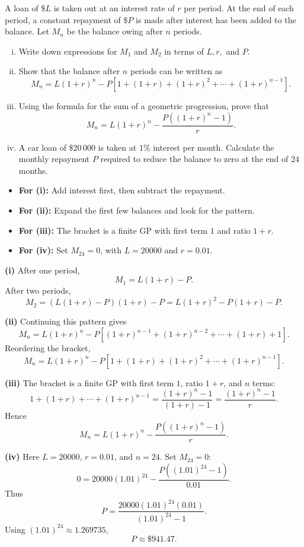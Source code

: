 \newpage
\begin{problem}
A loan of $\$L$ is taken out at an interest rate of $r$ per period. At the end of each period, a constant repayment of $\$P$ is made after interest has been added to the balance. Let $M_n$ be the balance owing after $n$ periods.

\begin{enumerate}[(i)]
\item Write down expressions for $M_1$ and $M_2$ in terms of $L,r,$ and $P$.
\item Show that the balance after $n$ periods can be written as
\[
M_n=L(1+r)^n-P\left[1+(1+r)+(1+r)^2+\cdots+(1+r)^{n-1}\right].
\]
\item Using the formula for the sum of a geometric progression, prove that
\[
M_n=L(1+r)^n-\frac{P((1+r)^n-1)}{r}.
\]
\item A car loan of $\$20\,000$ is taken at $1\%$ interest per month. Calculate the monthly repayment $P$ required to reduce the balance to zero at the end of $24$ months.
\end{enumerate}
\end{problem}
\begin{hint}
\begin{itemize}
\item \textbf{For (i):} Add interest first, then subtract the repayment.
\item \textbf{For (ii):} Expand the first few balances and look for the pattern.
\item \textbf{For (iii):} The bracket is a finite GP with first term $1$ and ratio $1+r$.
\item \textbf{For (iv):} Set $M_{24}=0$, with $L=20000$ and $r=0.01$.
\end{itemize}
\end{hint}
\begin{solution}
\textbf{(i)} After one period,
\[
M_1=L(1+r)-P.
\]
After two periods,
\[
M_2=(L(1+r)-P)(1+r)-P=L(1+r)^2-P(1+r)-P.
\]

\textbf{(ii)} Continuing this pattern gives
\[
M_n=L(1+r)^n-P\left[(1+r)^{n-1}+(1+r)^{n-2}+\cdots+(1+r)+1\right].
\]
Reordering the bracket,
\[
M_n=L(1+r)^n-P\left[1+(1+r)+(1+r)^2+\cdots+(1+r)^{n-1}\right].
\]

\textbf{(iii)} The bracket is a finite GP with first term $1$, ratio $1+r$, and $n$ terms:
\[
1+(1+r)+\cdots+(1+r)^{n-1}
=\frac{(1+r)^n-1}{(1+r)-1}
=\frac{(1+r)^n-1}{r}.
\]
Hence
\[
M_n=L(1+r)^n-\frac{P((1+r)^n-1)}{r}.
\]

\textbf{(iv)} Here $L=20000$, $r=0.01$, and $n=24$. Set $M_{24}=0$:
\[
0=20000(1.01)^{24}-\frac{P((1.01)^{24}-1)}{0.01}.
\]
Thus
\[
P=\frac{20000(1.01)^{24}(0.01)}{(1.01)^{24}-1}.
\]
Using $(1.01)^{24}\approx1.269735$,
\[
P\approx \$941.47.
\]
\end{solution}

